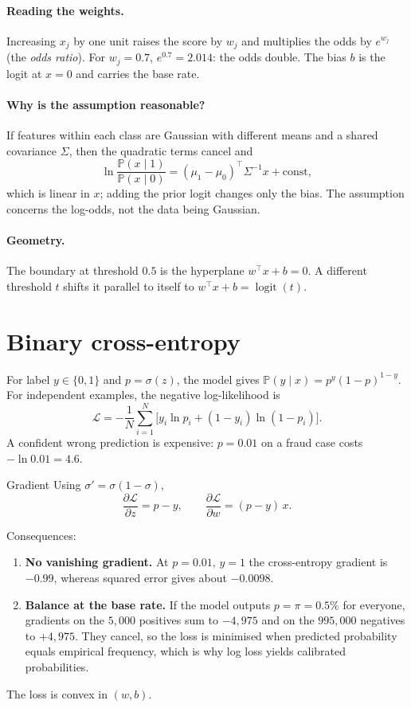 \documentclass[11pt,a4paper]{article}
\newcommand{\Prob}{\mathbb{P}}
\DeclareMathOperator{\logit}{logit}
\theoremstyle{definition}
\begin{document}
\paragraph{Reading the weights.} Increasing $x_j$ by one unit raises the score by $w_j$ and multiplies the odds by $e^{w_j}$ (the \emph{odds ratio}). For $w_j=0.7$, $e^{0.7}=2.014$: the odds double. The bias $b$ is the logit at $x=0$ and carries the base rate.

\paragraph{Why is the assumption reasonable?} If features within each class are Gaussian with different means and a shared covariance $\Sigma$, then the quadratic terms cancel and
\[
\ln\frac{\Prob(x\mid1)}{\Prob(x\mid0)}=(\mu_1-\mu_0)^\top\Sigma^{-1}x+\text{const},
\]
which is linear in $x$; adding the prior logit changes only the bias. The assumption concerns the log-odds, not the data being Gaussian.

\paragraph{Geometry.} The boundary at threshold $0.5$ is the hyperplane $w^\top x+b=0$. A different threshold $t$ shifts it parallel to itself to $w^\top x+b=\logit(t)$.

\section{Binary cross-entropy}

For label $y\in\{0,1\}$ and $p=\sigma(z)$, the model gives $\Prob(y\mid x)=p^{y}(1-p)^{1-y}$. For independent examples, the negative log-likelihood is
\[
\mathcal L=-\frac1N\sum_{i=1}^{N}\bigl[y_i\ln p_i+(1-y_i)\ln(1-p_i)\bigr].
\]
A confident wrong prediction is expensive: $p=0.01$ on a fraud case costs $-\ln 0.01=4.6$.

\begin{metric}{Gradient}
Using $\sigma'=\sigma(1-\sigma)$,
\[
\frac{\partial\mathcal L}{\partial z}=p-y,\qquad
\frac{\partial\mathcal L}{\partial w}=(p-y)\,x .
\]
\end{metric}

Consequences:
\begin{enumerate}
\item \textbf{No vanishing gradient.} At $p=0.01,\,y=1$ the cross-entropy gradient is $-0.99$, whereas squared error gives about $-0.0098$.
\item \textbf{Balance at the base rate.} If the model outputs $p=\pi=0.5\%$ for everyone, gradients on the $5{,}000$ positives sum to $-4{,}975$ and on the $995{,}000$ negatives to $+4{,}975$. They cancel, so the loss is minimised when predicted probability equals empirical frequency, which is why log loss yields calibrated probabilities.
\end{enumerate}
The loss is convex in $(w,b)$.
\end{document}
